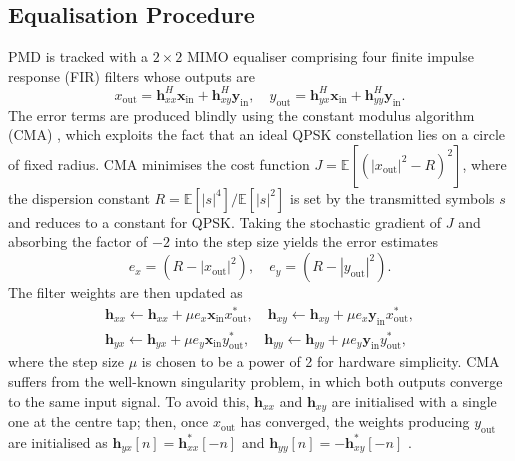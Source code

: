 \documentclass[12pt,a4paper]{article}
\begin{document}
\subsection{Equalisation Procedure}
PMD is tracked with a $2\times 2$ MIMO equaliser comprising four finite impulse response (FIR) filters whose outputs are
\begin{equation}
    x_\mathrm{out} = \mathbf{h}_{xx}^H \mathbf{x}_\mathrm{in} + \mathbf{h}_{xy}^H \mathbf{y}_\mathrm{in}, \quad y_\mathrm{out} = \mathbf{h}_{yx}^H \mathbf{x}_\mathrm{in} + \mathbf{h}_{yy}^H \mathbf{y}_\mathrm{in}.
    \label{eq:adaptive_output}
\end{equation}
The error terms are produced blindly using the constant modulus algorithm (CMA) \cite{coherent_receivers}, which exploits the fact that an ideal QPSK constellation lies on a circle of fixed radius. CMA minimises the cost function $J = \mathbb{E}\!\left[\left(|x_\mathrm{out}|^2 - R\right)^2\right]$, where the dispersion constant $R = \mathbb{E}[|s|^4]/\mathbb{E}[|s|^2]$ is set by the transmitted symbols $s$ and reduces to a constant for QPSK. Taking the stochastic gradient of $J$ and absorbing the factor of $-2$ into the step size yields the error estimates
\begin{equation}
    e_x = \left(R - |x_\mathrm{out}|^2\right), \quad e_y = \left(R - |y_\mathrm{out}|^2\right).
    \label{eq:cma_error}
\end{equation}
The filter weights are then updated as
\begin{equation}
    \begin{aligned}
    \mathbf{h}_{xx}\leftarrow \mathbf{h}_{xx} + \mu e_x \mathbf{x}_\mathrm{in}x_\mathrm{out}^*, \quad \mathbf{h}_{xy}\leftarrow \mathbf{h}_{xy} + \mu e_x \mathbf{y}_\mathrm{in}x_\mathrm{out}^*, \\
    \mathbf{h}_{yx}\leftarrow \mathbf{h}_{yx} + \mu e_y \mathbf{x}_\mathrm{in}y_\mathrm{out}^*, \quad \mathbf{h}_{yy}\leftarrow \mathbf{h}_{yy} + \mu e_y \mathbf{y}_\mathrm{in}y_\mathrm{out}^*,
    \end{aligned}
    \label{eq:adaptive_update}
\end{equation}
where the step size $\mu$ is chosen to be a power of 2 for hardware simplicity. CMA suffers from the well-known singularity problem, in which both outputs converge to the same input signal. To avoid this, $\mathbf{h}_{xx}$ and $\mathbf{h}_{xy}$ are initialised with a single one at the centre tap; then, once $x_\mathrm{out}$ has converged, the weights producing $y_\mathrm{out}$ are initialised as $\mathbf{h}_{yx}[n] = \mathbf{h}_{xx}^*[-n]$ and $\mathbf{h}_{yy}[n] = -\mathbf{h}_{xy}^*[-n]$ \cite{Liu;09}.
\end{document}
